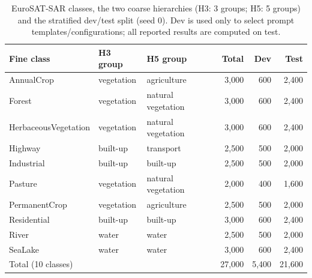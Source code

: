\begin{table}[t]
\centering
\footnotesize
\caption{EuroSAT-SAR classes, the two coarse hierarchies (H3: 3 groups; H5: 5 groups) and the stratified dev/test split (seed 0). Dev is used only to select prompt templates/configurations; all reported results are computed on test.}
\label{tab:dataset}
\begin{tabular*}{\hsize}{@{\extracolsep{\fill}}lllrrr@{}}
\toprule
Fine class & H3 group & H5 group & Total & Dev & Test \\
\midrule
AnnualCrop & vegetation & agriculture & 3,000 & 600 & 2,400 \\
Forest & vegetation & natural vegetation & 3,000 & 600 & 2,400 \\
HerbaceousVegetation & vegetation & natural vegetation & 3,000 & 600 & 2,400 \\
Highway & built-up & transport & 2,500 & 500 & 2,000 \\
Industrial & built-up & built-up & 2,500 & 500 & 2,000 \\
Pasture & vegetation & natural vegetation & 2,000 & 400 & 1,600 \\
PermanentCrop & vegetation & agriculture & 2,500 & 500 & 2,000 \\
Residential & built-up & built-up & 3,000 & 600 & 2,400 \\
River & water & water & 2,500 & 500 & 2,000 \\
SeaLake & water & water & 3,000 & 600 & 2,400 \\
\midrule
Total (10 classes) & & & 27,000 & 5,400 & 21,600 \\
\bottomrule
\end{tabular*}
\end{table}
